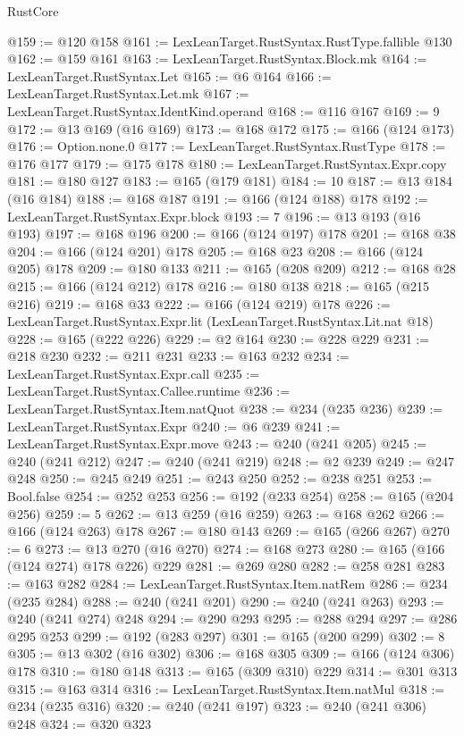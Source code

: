 \begin{lexlean}{RustCore}
\begin{coremodule}
@159 := @120 @158
@161 := LexLeanTarget.RustSyntax.RustType.fallible @130
@162 := @159 @161
@163 := LexLeanTarget.RustSyntax.Block.mk
@164 := LexLeanTarget.RustSyntax.Let
@165 := @6 @164
@166 := LexLeanTarget.RustSyntax.Let.mk
@167 := LexLeanTarget.RustSyntax.IdentKind.operand
@168 := @116 @167
@169 := 9
@172 := @13 @169 (@16 @169)
@173 := @168 @172
@175 := @166 (@124 @173)
@176 := Option.none.{0}
@177 := LexLeanTarget.RustSyntax.RustType
@178 := @176 @177
@179 := @175 @178
@180 := LexLeanTarget.RustSyntax.Expr.copy
@181 := @180 @127
@183 := @165 (@179 @181)
@184 := 10
@187 := @13 @184 (@16 @184)
@188 := @168 @187
@191 := @166 (@124 @188) @178
@192 := LexLeanTarget.RustSyntax.Expr.block
@193 := 7
@196 := @13 @193 (@16 @193)
@197 := @168 @196
@200 := @166 (@124 @197) @178
@201 := @168 @38
@204 := @166 (@124 @201) @178
@205 := @168 @23
@208 := @166 (@124 @205) @178
@209 := @180 @133
@211 := @165 (@208 @209)
@212 := @168 @28
@215 := @166 (@124 @212) @178
@216 := @180 @138
@218 := @165 (@215 @216)
@219 := @168 @33
@222 := @166 (@124 @219) @178
@226 := LexLeanTarget.RustSyntax.Expr.lit (LexLeanTarget.RustSyntax.Lit.nat @18)
@228 := @165 (@222 @226)
@229 := @2 @164
@230 := @228 @229
@231 := @218 @230
@232 := @211 @231
@233 := @163 @232
@234 := LexLeanTarget.RustSyntax.Expr.call
@235 := LexLeanTarget.RustSyntax.Callee.runtime
@236 := LexLeanTarget.RustSyntax.Item.natQuot
@238 := @234 (@235 @236)
@239 := LexLeanTarget.RustSyntax.Expr
@240 := @6 @239
@241 := LexLeanTarget.RustSyntax.Expr.move
@243 := @240 (@241 @205)
@245 := @240 (@241 @212)
@247 := @240 (@241 @219)
@248 := @2 @239
@249 := @247 @248
@250 := @245 @249
@251 := @243 @250
@252 := @238 @251
@253 := Bool.false
@254 := @252 @253
@256 := @192 (@233 @254)
@258 := @165 (@204 @256)
@259 := 5
@262 := @13 @259 (@16 @259)
@263 := @168 @262
@266 := @166 (@124 @263) @178
@267 := @180 @143
@269 := @165 (@266 @267)
@270 := 6
@273 := @13 @270 (@16 @270)
@274 := @168 @273
@280 := @165 (@166 (@124 @274) @178 @226) @229
@281 := @269 @280
@282 := @258 @281
@283 := @163 @282
@284 := LexLeanTarget.RustSyntax.Item.natRem
@286 := @234 (@235 @284)
@288 := @240 (@241 @201)
@290 := @240 (@241 @263)
@293 := @240 (@241 @274) @248
@294 := @290 @293
@295 := @288 @294
@297 := @286 @295 @253
@299 := @192 (@283 @297)
@301 := @165 (@200 @299)
@302 := 8
@305 := @13 @302 (@16 @302)
@306 := @168 @305
@309 := @166 (@124 @306) @178
@310 := @180 @148
@313 := @165 (@309 @310) @229
@314 := @301 @313
@315 := @163 @314
@316 := LexLeanTarget.RustSyntax.Item.natMul
@318 := @234 (@235 @316)
@320 := @240 (@241 @197)
@323 := @240 (@241 @306) @248
@324 := @320 @323

\end{coremodule}
\end{lexlean}
